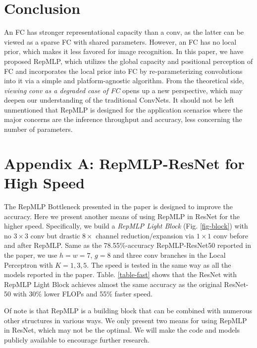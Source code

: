 \documentclass[10pt,twocolumn,letterpaper]{article}
\begin{document}
\section{Conclusion}

An FC has stronger representational capacity than a conv, as the latter can be viewed as a sparse FC with shared parameters. However, an FC has no local prior, which makes it less favored for image recognition. In this paper, we have proposed RepMLP, which utilizes the global capacity and positional perception of FC and incorporates the local prior into FC by re-parameterizing convolutions into it via a simple and platform-agnostic algorithm. From the theoretical side, \textit{viewing conv as a degraded case of FC} opens up a new perspective, which may deepen our understanding of the traditional ConvNets. It should not be left unmentioned that RepMLP is designed for the application scenarios where the major concerns are the inference throughput and accuracy, less concerning the number of parameters.



 










{\small


}

\clearpage

\section*{Appendix A: RepMLP-ResNet for High Speed}

The RepMLP Bottleneck presented in the paper is designed to improve the accuracy. Here we present another means of using RepMLP in ResNet for the higher speed. Specifically, we build a \textit{RepMLP Light Block} (Fig. \ref{fig-block}) with no $3\times3$ conv but drastic $8\times$ channel reduction/expansion via $1\times1$ conv before and after RepMLP. Same as the 78.55\%-accuracy RepMLP-ResNet50 reported in the paper, we use $h=w=7$, $g=8$ and three conv branches in the Local Perceptron with $K=1,3,5$. The speed is tested in the same way as all the models reported in the paper. Table. \ref{table-fast} shows that the ResNet with RepMLP Light Block achieves almost the same accuracy as the original ResNet-50 with 30\% lower FLOPs and 55\% faster speed.

Of note is that RepMLP is a building block that can be combined with numerous other structures in various ways. We only present two means for using RepMLP in ResNet, which may not be the optimal. We will make the code and models publicly available to encourage further research.
\end{document}
